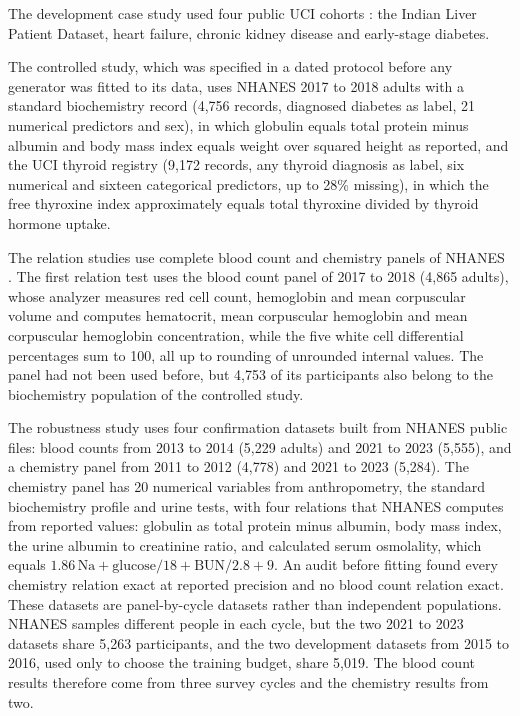 \documentclass[conference]{IEEEtran}
\begin{document}
The development case study used four public UCI cohorts \cite{uci}: the Indian Liver Patient Dataset, heart failure, chronic kidney disease and early-stage diabetes.

The controlled study, which was specified in a dated protocol before any generator was fitted to its data, uses NHANES 2017 to 2018 \cite{nhanes} adults with a standard biochemistry record (4,756 records, diagnosed diabetes as label, 21 numerical predictors and sex), in which globulin equals total protein minus albumin and body mass index equals weight over squared height as reported, and the UCI thyroid registry \cite{thyroid} (9,172 records, any thyroid diagnosis as label, six numerical and sixteen categorical predictors, up to 28\% missing), in which the free thyroxine index approximately equals total thyroxine divided by thyroid hormone uptake.

The relation studies use complete blood count and chemistry panels of NHANES \cite{nhanes}. The first relation test uses the blood count panel of 2017 to 2018 (4,865 adults), whose analyzer measures red cell count, hemoglobin and mean corpuscular volume and computes hematocrit, mean corpuscular hemoglobin and mean corpuscular hemoglobin concentration, while the five white cell differential percentages sum to 100, all up to rounding of unrounded internal values. The panel had not been used before, but 4,753 of its participants also belong to the biochemistry population of the controlled study.

The robustness study uses four confirmation datasets built from NHANES public files: blood counts from 2013 to 2014 (5,229 adults) and 2021 to 2023 (5,555), and a chemistry panel from 2011 to 2012 (4,778) and 2021 to 2023 (5,284). The chemistry panel has 20 numerical variables from anthropometry, the standard biochemistry profile and urine tests, with four relations that NHANES computes from reported values: globulin as total protein minus albumin, body mass index, the urine albumin to creatinine ratio, and calculated serum osmolality, which equals $1.86\,\mathrm{Na} + \mathrm{glucose}/18 + \mathrm{BUN}/2.8 + 9$. An audit before fitting found every chemistry relation exact at reported precision and no blood count relation exact. These datasets are panel-by-cycle datasets rather than independent populations. NHANES samples different people in each cycle, but the two 2021 to 2023 datasets share 5,263 participants, and the two development datasets from 2015 to 2016, used only to choose the training budget, share 5,019. The blood count results therefore come from three survey cycles and the chemistry results from two.
\end{document}
